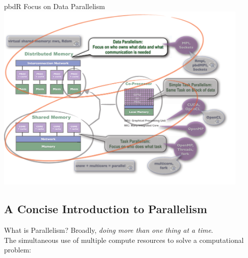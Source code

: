 \begin{frame}
\begin{block}{pbdR Focus on Data Parallelism}
    \includegraphics[width=0.91\textwidth]{pics/ParallelHardware11.pdf}
\end{block}
\end{frame}

\setcounter{framenumber}{0}

\subsection{A Concise Introduction to Parallelism}

\begin{frame}
  \begin{block}{What is Parallelism?}\pause
  Broadly, \emph{doing more than one thing at a time}.\\[.2cm]
  
  The simultaneous use of multiple compute resources to solve a computational problem: 
  \end{block}
\end{frame}

